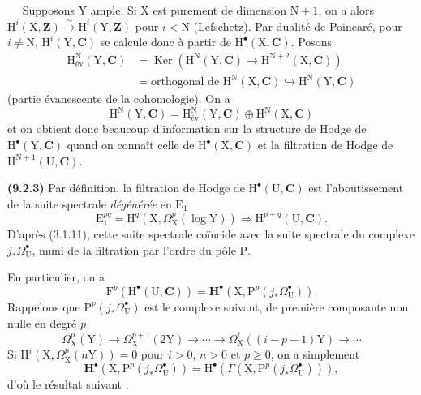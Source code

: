 \documentclass[11pt,leqno]{article}
\newcommand{\Page}[1]{\ifvmode\noindent\else\unskip\ \fi{\footnotesize\textcolor{gray}{[p.\,#1]}}\ \ignorespaces}
\begin{document}
\Page{49}
Supposons \(\mathrm{Y}\) ample. Si \(\mathrm{X}\) est purement de dimension \(\mathrm{N}+1\), on a alors \(\mathrm{H}^{i}(\mathrm{X},\mathbf{Z})\xrightarrow{\sim}\mathrm{H}^{i}(\mathrm{Y},\mathbf{Z})\) pour \(i<\mathrm{N}\) (Lefschetz). Par dualité de Poincaré, pour \(i\neq\mathrm{N}\), \(\mathrm{H}^{i}(\mathrm{Y},\mathbf{C})\) se calcule donc à partir de \(\mathrm{H}^{\bullet}(\mathrm{X},\mathbf{C})\). Posons
\[
\begin{aligned}
\mathrm{H}_{\text{év}}^{\mathrm{N}}(\mathrm{Y},\mathbf{C})
&=\operatorname{Ker}(\mathrm{H}^{\mathrm{N}}(\mathrm{Y},\mathbf{C})\to\mathrm{H}^{\mathrm{N}+2}(\mathrm{X},\mathbf{C}))\\
&=\text{orthogonal de }\mathrm{H}^{\mathrm{N}}(\mathrm{X},\mathbf{C})
\hookrightarrow\mathrm{H}^{\mathrm{N}}(\mathrm{Y},\mathbf{C})
\end{aligned}
\]
(partie évanescente de la cohomologie). On a
\[
\mathrm{H}^{\mathrm{N}}(\mathrm{Y},\mathbf{C})
=\mathrm{H}_{\text{év}}^{\mathrm{N}}(\mathrm{Y},\mathbf{C})
\oplus\mathrm{H}^{\mathrm{N}}(\mathrm{X},\mathbf{C})
\]
et on obtient donc beaucoup d’information sur la structure de Hodge de \(\mathrm{H}^{\bullet}(\mathrm{Y},\mathbf{C})\) quand on connaît celle de \(\mathrm{H}^{\bullet}(\mathrm{X},\mathbf{C})\) et la filtration de Hodge de \(\mathrm{H}^{\mathrm{N}+1}(\mathrm{U},\mathbf{C})\).

\textbf{(9.2.3)} Par définition, la filtration de Hodge de \(\mathrm{H}^{\bullet}(\mathrm{U},\mathbf{C})\) est l’aboutissement de la suite spectrale \textit{dégénérée} en \(\mathrm{E}_{1}\)
\[
\mathrm{E}_{1}^{pq}
=\mathrm{H}^{q}(\mathrm{X},\Omega_{\mathrm{X}}^{p}(\log\mathrm{Y}))
\Rightarrow\mathrm{H}^{p+q}(\mathrm{U},\mathbf{C}).
\]
D’après (3.1.11), cette suite spectrale coïncide avec la suite spectrale du complexe \(j_{*}\Omega_{\mathrm{U}}^{\bullet}\), muni de la filtration par l’ordre du pôle \(\mathrm{P}\).

En particulier, on a
\[
\mathrm{F}^{p}(\mathrm{H}^{\bullet}(\mathrm{U},\mathbf{C}))
=\mathbf{H}^{\bullet}(\mathrm{X},\mathrm{P}^{p}(j_{*}\Omega_{\mathrm{U}}^{\bullet})).
\]
Rappelons que \(\mathrm{P}^{p}(j_{*}\Omega_{\mathrm{U}}^{\bullet})\) est le complexe suivant, de première composante non nulle en degré \(p\)
\[
\Omega_{\mathrm{X}}^{p}(\mathrm{Y})
\to\Omega_{\mathrm{X}}^{p+1}(2\mathrm{Y})
\to\cdots\to
\Omega_{\mathrm{X}}^{i}((i-p+1)\mathrm{Y})
\to\cdots
\]
Si \(\mathrm{H}^{i}(\mathrm{X},\Omega_{\mathrm{X}}^{p}(n\mathrm{Y}))=0\) pour \(i>0\), \(n>0\) et \(p\geq0\), on a simplement
\[
\mathbf{H}^{\bullet}(\mathrm{X},\mathrm{P}^{p}(j_{*}\Omega_{\mathrm{U}}^{\bullet}))
=\mathrm{H}^{\bullet}(\Gamma(\mathrm{X},\mathrm{P}^{p}(j_{*}\Omega_{\mathrm{U}}^{\bullet}))),
\]
d’où le résultat suivant :
\end{document}
